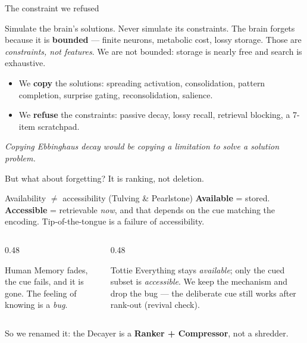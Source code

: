 \documentclass[aspectratio=169,10pt]{beamer}
\begin{document}
\begin{frame}{The constraint we refused}
  \begin{block}{Simulate the brain's solutions. Never simulate its constraints.}
    The brain forgets because it is \textbf{bounded} --- finite neurons, metabolic cost, lossy storage.
    Those are \emph{constraints, not features}. We are not bounded: storage is nearly free and search
    is exhaustive.
  \end{block}
  \begin{itemize}
    \item We \textbf{copy} the solutions: spreading activation, consolidation, pattern completion,
    surprise gating, reconsolidation, salience.
    \item We \textbf{refuse} the constraints: passive decay, lossy recall, retrieval blocking, a 7-item
    scratchpad.
  \end{itemize}
  \vfill
  \centering\itshape Copying Ebbinghaus decay would be copying a limitation to solve a solution problem.
\end{frame}

\begin{frame}{But what about forgetting? It is ranking, not deletion.}
  \begin{block}{Availability $\neq$ accessibility (Tulving \& Pearlstone)}
    \textbf{Available} = stored. \textbf{Accessible} = retrievable \emph{now}, and that depends on the
    cue matching the encoding. Tip-of-the-tongue is a failure of accessibility.
  \end{block}
  \begin{columns}
    \begin{column}{0.48\textwidth}
      \begin{block}{Human}
        Memory fades, the cue fails, and it is gone. The feeling of knowing is a \emph{bug}.
      \end{block}
    \end{column}
    \begin{column}{0.48\textwidth}
      \begin{alertblock}{Tottie}
        Everything stays \emph{available}; only the cued subset is \emph{accessible}. We keep the
        mechanism and drop the bug --- the deliberate cue still works after rank-out (revival check).
      \end{alertblock}
    \end{column}
  \end{columns}
  \vfill
  \centering So we renamed it: the Decayer is a \textbf{Ranker + Compressor}, not a shredder.
\end{frame}
\end{document}
